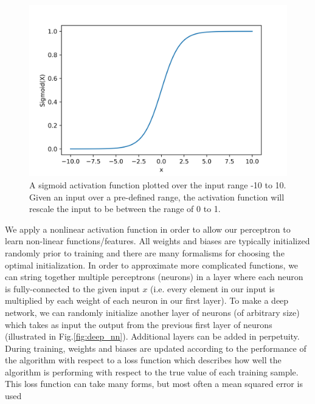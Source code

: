 \begin{figure}
    \centering
    \includegraphics[width=\linewidth]{figures/sigmoid_function.png}
    \caption{A sigmoid activation function plotted over the input 
    range -10 to 10. Given an input over a pre-defined range, the 
    activation function will rescale the input to be between the range 
    of 0 to 1.}
    \label{fig:sigmoid}
\end{figure}

We apply a nonlinear activation function in order to allow our perceptron to learn non-linear functions/features. All weights and biases are typically initialized randomly prior to training and there are many formalisms for choosing the optimal initialization. In order to approximate more complicated functions, we can string together multiple perceptrons (neurons) in a layer where each neuron is fully-connected to the given input $x$ (i.e. every element in our input is multiplied by each weight of each neuron in our first layer). To make a deep network, we can randomly initialize another layer of neurons (of arbitrary size) which takes as input the output from the previous first layer of neurons (illustrated in Fig.\ref{fig:deep_nn}). Additional layers can be added in perpetuity. During training, weights and biases are updated according to the performance of the algorithm with respect to a loss function which describes how well the algorithm is performing with respect to the true value of each training sample. This loss function can take many forms, but most often a mean squared error is used

